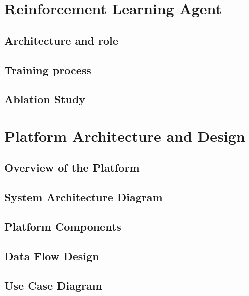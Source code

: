 \section{Reinforcement Learning Agent}
\subsection{Architecture and role}
\subsection{Training process}
\subsection{Ablation Study}
\section{Platform Architecture and Design}

\subsection{Overview of the Platform}

\subsection{System Architecture Diagram}

\subsection{Platform Components}

\subsection{Data Flow Design}

\subsection{Use Case Diagram}

